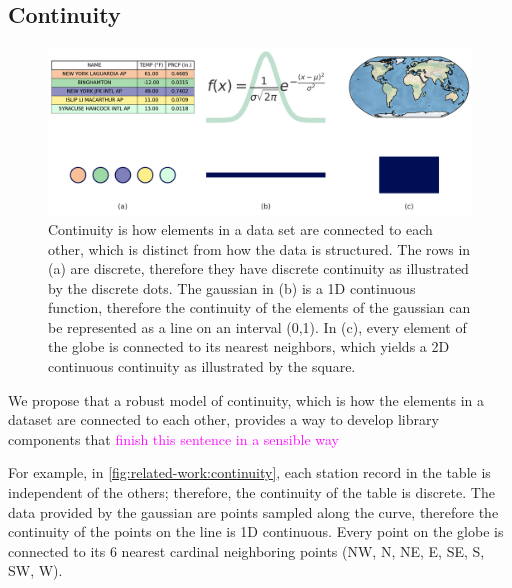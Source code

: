 \documentclass[10pt,journal,compsoc]{IEEEtran}
\newcommand{\note}[1]{\textcolor{magenta}{#1}}
\theoremstyle{definition}
\theoremstyle{remark}
\begin{document}
\subsection{Continuity}
\begin{figure}[!h]
  \includegraphics[width=\columnwidth]{k_different_types.png}
  \caption{Continuity is how elements in a data set are connected to each other, which is distinct from how the data is structured. The rows in (a) are discrete, therefore they have discrete continuity as illustrated by the discrete dots. The gaussian in (b) is a 1D continuous function, therefore the continuity of the elements of the gaussian can be represented as a line on an interval (0,1). In (c), every element of the globe is connected to its nearest neighbors, which yields a 2D continuous continuity as illustrated by the square.}
  \label{fig:related-work:continuity}
\end{figure}
We propose that a robust model of continuity, which is how the elements in a dataset are connected to each other, provides a way to develop library components that \note{finish this sentence in a sensible way}

For example, in \autoref{fig:related-work:continuity}, each station record in the table is independent of the others; therefore, the continuity of the table is discrete. The data provided by the gaussian are points sampled along the curve, therefore the continuity of the points on the line is 1D continuous. Every point on the globe is connected to its 6 nearest cardinal neighboring points (NW, N, NE, E, SE, S, SW, W). 
\end{document}
